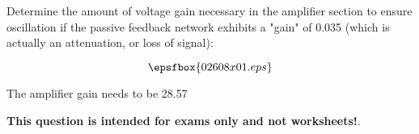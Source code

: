 

Determine the amount of voltage gain necessary in the amplifier section to ensure oscillation if the passive feedback network exhibits a "gain" of 0.035 (which is actually an attenuation, or loss of signal):

$$\epsfbox{02608x01.eps}$$







The amplifier gain needs to be 28.57







{\bf This question is intended for exams only and not worksheets!}.




